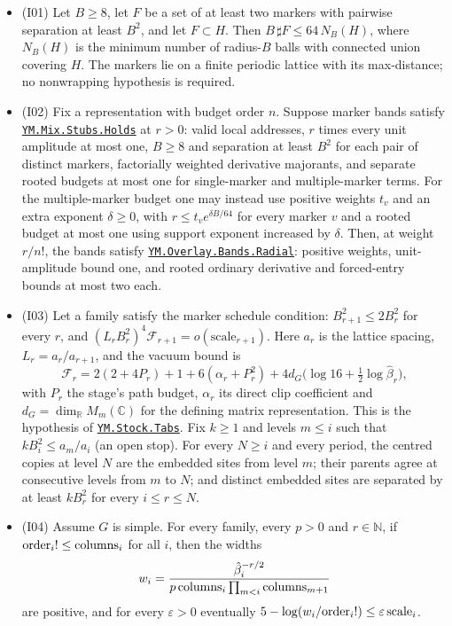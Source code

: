 \documentclass[
  letterpaper,
  11pt]{article}
\begin{document}
\begin{itemize}
\item
  (I01) Let \(B\ge8\), let \(F\) be a set of at least two markers with
  pairwise separation at least \(B^2\), and let \(F\subset H\). Then
  \(B\,\sharp F\le64\,N_B(H)\), where \(N_B(H)\) is the minimum number
  of radius-\(B\) balls with connected union covering \(H\). The markers
  lie on a finite periodic lattice with its max-distance; no nonwrapping
  hypothesis is required.
\item
  (I02) Fix a representation with budget order \(n\). Suppose marker
  bands satisfy
  \href{https://github.com/yang-mills-group/OpenAI-YM-20261028/blob/3456e5e75cf8d4cd558955a5c7638fba2d68f464/YM/Bid/Fuels.lean\#L66-L70}{\texttt{YM.Mix.Stubs.Holds}}
  at \(r>0\): valid local addresses, \(r\) times every unit amplitude at
  most one, \(B\ge8\) and separation at least \(B^2\) for each pair of
  distinct markers, factorially weighted derivative majorants, and
  separate rooted budgets at most one for single-marker and
  multiple-marker terms. For the multiple-marker budget one may instead
  use positive weights \(t_v\) and an extra exponent \(\delta\ge0\),
  with \(r\le t_v e^{\delta B/64}\) for every marker \(v\) and a rooted
  budget at most one using support exponent increased by \(\delta\).
  Then, at weight \(r/n!\), the bands satisfy
  \href{https://github.com/yang-mills-group/OpenAI-YM-20261028/blob/3456e5e75cf8d4cd558955a5c7638fba2d68f464/YM/Overlay/Table.lean\#L56-L65}{\texttt{YM.Overlay.Bands.Radial}}:
  positive weights, unit-amplitude bound one, and rooted ordinary
  derivative and forced-entry bounds at most two each.
\item
  (I03) Let a family satisfy the marker schedule condition:
  \(B_{r+1}^2\le2B_r^2\) for every \(r\), and
  \((L_rB_r^2)^4\mathcal F_{r+1}=o(\mathrm{scale}_{r+1})\). Here \(a_r\)
  is the lattice spacing, \(L_r=a_r/a_{r+1}\), and the vacuum bound is
  \[\mathcal F_r=2(2+4P_r)+1+6(\alpha_r+P_r^2)+4d_G\big(\log16+\tfrac12\log\hat\beta_r\big),\]
  with \(P_r\) the stage's path budget, \(\alpha_r\) its direct clip
  coefficient and \(d_G=\dim_{\mathbb R}M_m(\mathbb C)\) for the
  defining matrix representation. This is the hypothesis of
  \href{https://github.com/yang-mills-group/OpenAI-YM-20261028/blob/3456e5e75cf8d4cd558955a5c7638fba2d68f464/YM/Overlay/Prior.lean\#L15-L18}{\texttt{YM.Stock.Tabs}}.
  Fix \(k\ge1\) and levels \(m\le i\) such that \(kB_i^2\le a_m/a_i\)
  (an open stop). For every \(N\ge i\) and every period, the centred
  copies at level \(N\) are the embedded sites from level \(m\); their
  parents agree at consecutive levels from \(m\) to \(N\); and distinct
  embedded sites are separated by at least \(kB_r^2\) for every
  \(i\le r\le N\).
\item
  (I04) Assume \(G\) is simple. For every family, every \(p>0\) and
  \(r\in\mathbb N\), if \({\rm order}_i!\le{\rm columns}_i\) for all
  \(i\), then the widths
  \[w_i=\frac{\hat\beta_i^{-r/2}}{p\,{\rm columns}_i\prod_{m<i}{\rm columns}_{m+1}}\]
  are positive, and for every \(\varepsilon>0\) eventually
  \(5-\log(w_i/{\rm order}_i!)\le\varepsilon\,{\rm scale}_i\).
\end{itemize}
\end{document}
